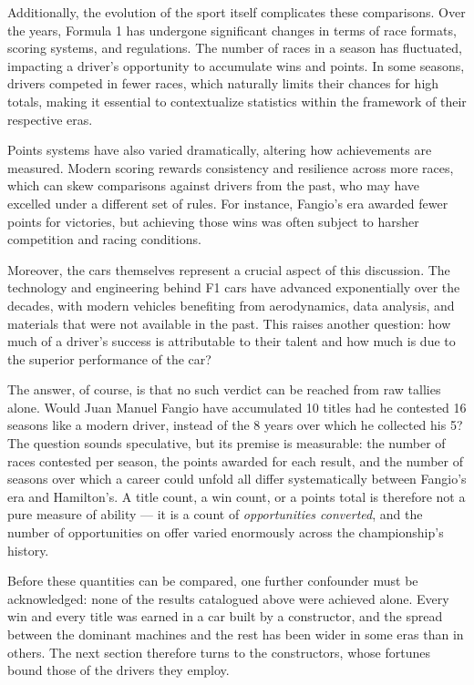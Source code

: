 \documentclass[
]{article}
\begin{document}
Additionally, the evolution of the sport itself complicates these
comparisons. Over the years, Formula 1 has undergone significant changes
in terms of race formats, scoring systems, and regulations. The number
of races in a season has fluctuated, impacting a driver's opportunity to
accumulate wins and points. In some seasons, drivers competed in fewer
races, which naturally limits their chances for high totals, making it
essential to contextualize statistics within the framework of their
respective eras.

Points systems have also varied dramatically, altering how achievements
are measured. Modern scoring rewards consistency and resilience across
more races, which can skew comparisons against drivers from the past,
who may have excelled under a different set of rules. For instance,
Fangio's era awarded fewer points for victories, but achieving those
wins was often subject to harsher competition and racing conditions.

Moreover, the cars themselves represent a crucial aspect of this
discussion. The technology and engineering behind F1 cars have advanced
exponentially over the decades, with modern vehicles benefiting from
aerodynamics, data analysis, and materials that were not available in
the past. This raises another question: how much of a driver's success
is attributable to their talent and how much is due to the superior
performance of the car?

The answer, of course, is that no such verdict can be reached from raw
tallies alone. Would Juan Manuel Fangio have accumulated 10 titles had
he contested 16 seasons like a modern driver, instead of the 8 years
over which he collected his 5? The question sounds speculative, but its
premise is measurable: the number of races contested per season, the
points awarded for each result, and the number of seasons over which a
career could unfold all differ systematically between Fangio's era and
Hamilton's. A title count, a win count, or a points total is therefore
not a pure measure of ability --- it is a count of \emph{opportunities
converted}, and the number of opportunities on offer varied enormously
across the championship's history.

Before these quantities can be compared, one further confounder must be
acknowledged: none of the results catalogued above were achieved alone.
Every win and every title was earned in a car built by a constructor,
and the spread between the dominant machines and the rest has been wider
in some eras than in others. The next section therefore turns to the
constructors, whose fortunes bound those of the drivers they employ.
\end{document}
